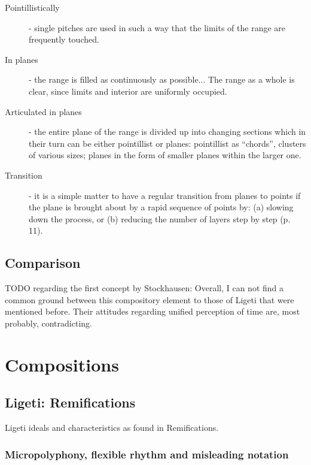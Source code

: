 \documentclass[a4paper,11pt]{article}
\newenvironment{MyShadequote}[1][]{%
    \ignorespaces%
    \begin{mdframed}[style=MyShadeQuoteStyle,#1]%
}{%
    \end{mdframed}%
    \ignorespacesafterend%
}%
\begin{document}
\begin{MyShadequote}
  \begin{description}
    \item[Pointillistically] - single pitches are used in such a way that the limits of the range are frequently touched.

    \item[In planes] - the range is filled as continuously as possible...
    The range as a whole is clear, since limits and interior are uniformly occupied.

    \item[Articulated in planes] - the entire plane of the range is divided up into changing sections which in their turn can be either pointillist or planes:
    pointillist as ``chords'', clusters of various sizes;
    planes in the form of smaller planes within the larger one.

    \item[Transition] - it is a simple matter to have a regular transition from planes to points if the plane is brought about by a rapid sequence of points by:
    (a) slowing down the process,
    or (b) reducing the number of layers step by step (p. 11).
  \end{description}

\end{MyShadequote}

\subsection{Comparison}

TODO regarding the first concept by Stockhausen:
Overall, I can not find a common ground between this compository element to those of Ligeti that were mentioned before.
Their attitudes regarding unified perception of time are, most probably, contradicting.

\section{Compositions}
\label{sec:compositions}

\subsection{Ligeti: Remifications}
\label{sub:composition_ligeti}

Ligeti ideals and characteristics as found in Remifications.

\subsubsection{Micropolyphony, flexible rhythm and misleading notation}
\end{document}
